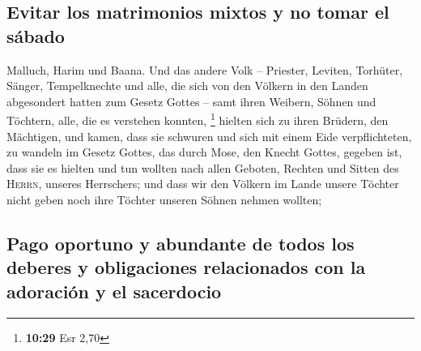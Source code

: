 \hypertarget{evitar-los-matrimonios-mixtos-y-no-tomar-el-suxe1bado}{%
\subsection{Evitar los matrimonios mixtos y no tomar el
sábado}\label{evitar-los-matrimonios-mixtos-y-no-tomar-el-suxe1bado}}

 Malluch, Harim und Baana.  Und das andere
Volk -- Priester, Leviten, Torhüter, Sänger, Tempelknechte und alle, die
sich von den Völkern in den Landen abgesondert hatten zum Gesetz Gottes
-- samt ihren Weibern, Söhnen und Töchtern, alle, die es verstehen
konnten, \footnote{\textbf{10:29} Esr 2,70}  hielten sich
zu ihren Brüdern, den Mächtigen, und kamen, dass sie schwuren und sich
mit einem Eide verpflichteten, zu wandeln im Gesetz Gottes, das durch
Mose, den Knecht Gottes, gegeben ist, dass sie es hielten und tun
wollten nach allen Geboten, Rechten und Sitten des \textsc{Herrn},
unseres Herrschers;  und dass wir den Völkern im Lande
unsere Töchter nicht geben noch ihre Töchter unseren Söhnen nehmen
wollten;

\hypertarget{pago-oportuno-y-abundante-de-todos-los-deberes-y-obligaciones-relacionados-con-la-adoraciuxf3n-y-el-sacerdocio}{%
\subsection{Pago oportuno y abundante de todos los deberes y
obligaciones relacionados con la adoración y el
sacerdocio}\label{pago-oportuno-y-abundante-de-todos-los-deberes-y-obligaciones-relacionados-con-la-adoraciuxf3n-y-el-sacerdocio}}

